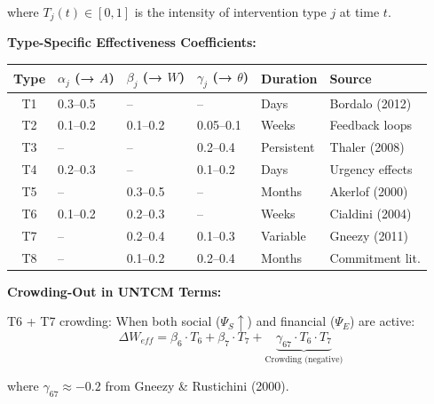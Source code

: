 \begin{tcolorbox}[colback=green!5!white, colframe=green!75!black,
    title=\textbf{Integration UNTCM-I2: 10C Intervention Vector Mapping}]
where $T_j(t) \in [0, 1]$ is the intensity of intervention type $j$ at time $t$.

\textbf{Type-Specific Effectiveness Coefficients:}

\begin{center}
\renewcommand{\arraystretch}{1.2}
\begin{tabular}{@{}clllll@{}}
\toprule
\textbf{Type} & $\alpha_j$ (→ $A$) & $\beta_j$ (→ $W$) & $\gamma_j$ (→ $\theta$) & \textbf{Duration} & \textbf{Source} \\
\midrule
T1 & 0.3--0.5 & -- & -- & Days & Bordalo (2012) \\
T2 & 0.1--0.2 & 0.1--0.2 & 0.05--0.1 & Weeks & Feedback loops \\
T3 & -- & -- & 0.2--0.4 & Persistent & Thaler (2008) \\
T4 & 0.2--0.3 & -- & 0.1--0.2 & Days & Urgency effects \\
T5 & -- & 0.3--0.5 & -- & Months & Akerlof (2000) \\
T6 & 0.1--0.2 & 0.2--0.3 & -- & Weeks & Cialdini (2004) \\
T7 & -- & 0.2--0.4 & 0.1--0.3 & Variable & Gneezy (2011) \\
T8 & -- & 0.1--0.2 & 0.2--0.4 & Months & Commitment lit. \\
\bottomrule
\end{tabular}
\end{center}

\textbf{Crowding-Out in UNTCM Terms:}

T6 + T7 crowding: When both social ($\Psi_S \uparrow$) and financial ($\Psi_E$) are active:
\begin{equation}
\Delta W_{eff} = \beta_6 \cdot T_6 + \beta_7 \cdot T_7 + \underbrace{\gamma_{67} \cdot T_6 \cdot T_7}_{\text{Crowding (negative)}}
\end{equation}

where $\gamma_{67} \approx -0.2$ from Gneezy \& Rustichini (2000).

\end{tcolorbox}

